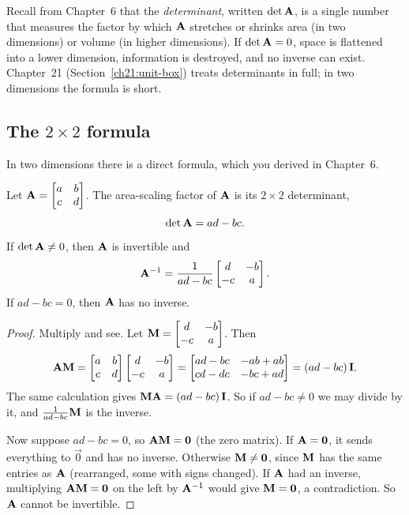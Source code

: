 Recall from Chapter~6 that the \emph{determinant}, written $\det\mathbf{A}$, is a single number
that measures the factor by which $\mathbf{A}$ stretches or shrinks area (in two dimensions)
or volume (in higher dimensions). If $\det\mathbf{A} = 0$, space is flattened into a lower
dimension, information is destroyed, and no inverse can exist. Chapter~21
(Section~\ref{ch21:unit-box}) treats determinants in full; in two dimensions the formula
is short.

\subsection{The $2\times2$ formula}

In two dimensions there is a direct formula, which you derived in Chapter~6.

\begin{theorem}
\label{ch08:2x2inv}
Let $\mathbf{A} = \begin{bmatrix} a & b \\ c & d \end{bmatrix}$. The area-scaling factor
of $\mathbf{A}$ is its $2\times 2$ determinant,
\[
\det\mathbf{A} = ad - bc.
\]
If $\det\mathbf{A}\ne 0$, then $\mathbf{A}$ is invertible and
\[
\mathbf{A}^{-1} = \frac{1}{ad-bc}\begin{bmatrix} d & -b \\ -c & a \end{bmatrix}.
\]
If $ad - bc = 0$, then $\mathbf{A}$ has no inverse.
\end{theorem}

\begin{proof}
Multiply and see. Let $\mathbf{M} = \begin{bmatrix} d & -b \\ -c & a \end{bmatrix}$. Then
\[
\mathbf{A}\mathbf{M} = \begin{bmatrix} a & b \\ c & d \end{bmatrix}
\begin{bmatrix} d & -b \\ -c & a \end{bmatrix}
= \begin{bmatrix} ad - bc & -ab + ab \\ cd - dc & -bc + ad \end{bmatrix}
= (ad-bc)\,\mathbf{I}.
\]
The same calculation gives $\mathbf{M}\mathbf{A} = (ad-bc)\,\mathbf{I}$.
So if $ad-bc \ne 0$ we may divide by it, and $\frac{1}{ad-bc}\mathbf{M}$ is the inverse.

Now suppose $ad - bc = 0$, so $\mathbf{A}\mathbf{M} = \mathbf{0}$ (the zero matrix). If
$\mathbf{A} = \mathbf{0}$, it sends everything to $\vec{0}$ and has no inverse.
Otherwise $\mathbf{M}\ne\mathbf{0}$, since $\mathbf{M}$ has the same entries as $\mathbf{A}$
(rearranged, some with signs changed). If $\mathbf{A}$ had an inverse, multiplying
$\mathbf{A}\mathbf{M} = \mathbf{0}$ on the left by $\mathbf{A}^{-1}$ would give $\mathbf{M}=\mathbf{0}$,
a contradiction. So $\mathbf{A}$ cannot be invertible.
\end{proof}


